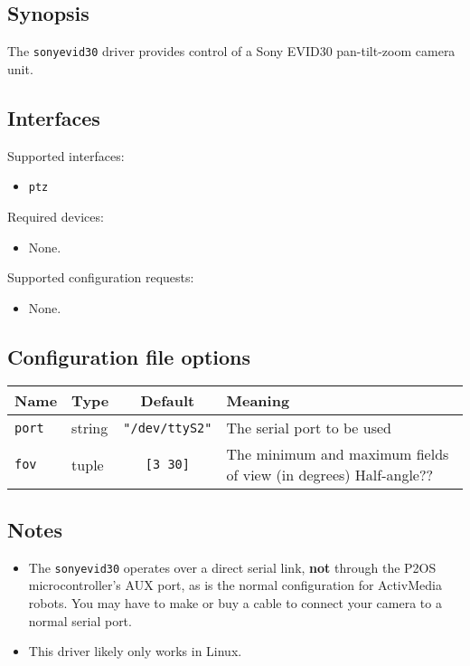 \subsection*{Synopsis}
The {\tt sonyevid30} driver provides control of a Sony EVID30 pan-tilt-zoom
camera unit.

\subsection*{Interfaces}

\noindent Supported interfaces:
\begin{itemize}
\item {\tt ptz}
\end{itemize}

\noindent Required devices:
\begin{itemize}
\item None.
\end{itemize}

\noindent Supported configuration requests:
\begin{itemize}
\item None.
\end{itemize}

\subsection*{Configuration file options}

\begin{center}
{\small \begin{tabularx}{\columnwidth}{|l|l|c|X|}
\hline
Name & Type & Default & Meaning\\
\hline
{\tt port} & string & {\tt "/dev/ttyS2"} & The serial port to be used\\
{\tt fov} & tuple & {\tt [3 30]} & The minimum and maximum fields of view (in
degrees) Half-angle??\\
\hline
\end{tabularx}}
\end{center}

\subsection*{Notes}
\begin{itemize}
\item The {\tt sonyevid30} operates over a direct serial link, {\bf not}
through the P2OS microcontroller's AUX port, as is the normal configuration
for ActivMedia robots.  You may have to make or buy a cable to connect your
camera to a normal serial port.
\item This driver likely only works in Linux.
\end{itemize}
